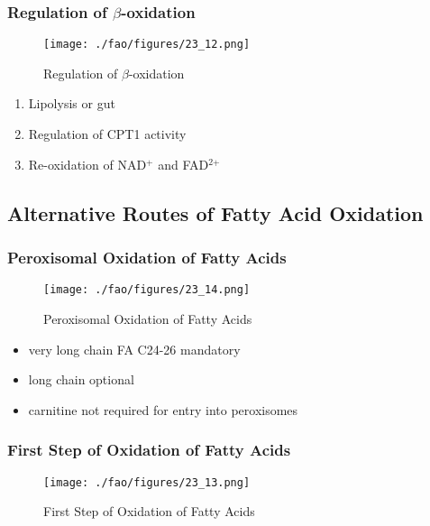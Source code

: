 \documentclass{scrartcl}
\begin{document}
\subsubsection{Regulation of \(\beta\)-oxidation}
\label{sec:org5306b90}
\begin{figure}[htbp]
\centering
\texttt{[image: ./fao/figures/23\_12.png]}
\caption{\label{fig:org8d36388}
Regulation of \(\beta\)-oxidation}
\end{figure}

\begin{enumerate}
\item Lipolysis or gut
\item Regulation of CPT1 activity
\item Re-oxidation of NAD\(^{\text{+}}\) and FAD\(^{\text{2+}}\)
\end{enumerate}

\subsection{Alternative Routes of Fatty Acid Oxidation}
\label{sec:orgc9cf0b0}

\subsubsection{Peroxisomal Oxidation of Fatty Acids}
\label{sec:orgfe6336c}

\begin{figure}[htbp]
\centering
\texttt{[image: ./fao/figures/23\_14.png]}
\caption{\label{fig:orge2a3102}
Peroxisomal Oxidation of Fatty Acids}
\end{figure}

\begin{itemize}
\item very long chain FA C24-26 mandatory
\item long chain optional
\item carnitine not required for entry into peroxisomes
\end{itemize}

\subsubsection{First Step of Oxidation of Fatty Acids}
\label{sec:org5f1c0fe}
\begin{figure}[htbp]
\centering
\texttt{[image: ./fao/figures/23\_13.png]}
\caption{\label{fig:org8acd8b6}
First Step of Oxidation of Fatty Acids}
\end{figure}
\end{document}
